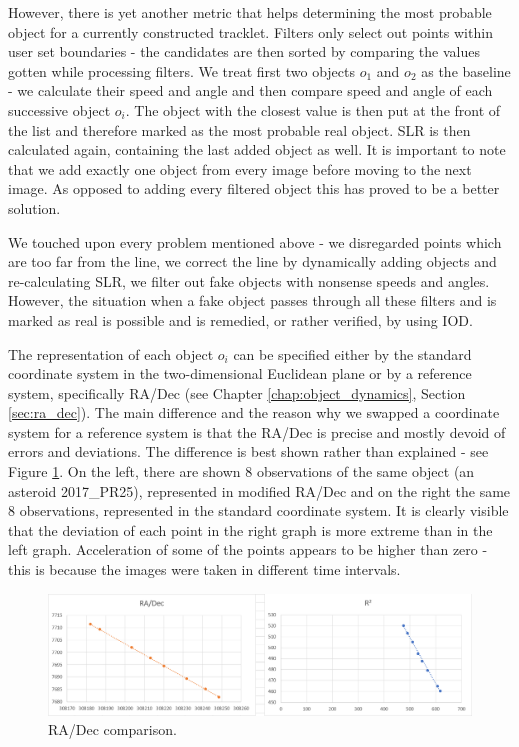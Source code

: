 	However, there is yet another metric that helps determining the most probable object for a currently constructed tracklet. Filters only select out points within user set boundaries - the candidates are then sorted by comparing the values gotten while processing filters. We treat first two objects $o_1$ and $o_2$ as the baseline - we calculate their speed and angle and then compare speed and angle of each successive object $o_i$. The object with the closest value is then put at the front of the list and therefore marked as the most probable real object. SLR is then calculated again, containing the last added object as well. It is important to note that we add exactly one object from every image before moving to the next image. As opposed to adding every filtered object this has proved to be a better solution.
	
	We touched upon every problem mentioned above - we disregarded points which are too far from the line, we correct the line by dynamically adding objects and re-calculating SLR, we filter out fake objects with nonsense speeds and angles. However, the situation when a fake object passes through all these filters and is marked as real is possible and is remedied, or rather verified, by using IOD.
	
	The representation of each object $o_i$ can be specified either by the standard coordinate system in the two-dimensional Euclidean plane or by a reference system, specifically RA/Dec (see Chapter \ref{chap:object_dynamics}, Section \ref{sec:ra_dec}). The main difference and the reason why we swapped a coordinate system for a reference system is that the RA/Dec is precise and mostly devoid of errors and deviations. The difference is best shown rather than explained - see Figure \ref{fig:regresia3}. On the left, there are shown 8 observations of the same object (an asteroid 2017\_PR25), represented in modified RA/Dec and on the right the same 8 observations, represented in the standard coordinate system. It is clearly visible that the deviation of each point in the right graph is more extreme than in the left graph. Acceleration of some of the points appears to be higher than zero - this is because the images were taken in different time intervals.
	
	\begin{figure}[H]
	\centering
	  \includegraphics[width=\linewidth]{images/regresia3}
		  \caption{RA/Dec comparison.}
	  \label{fig:regresia3}
	\end{figure}

